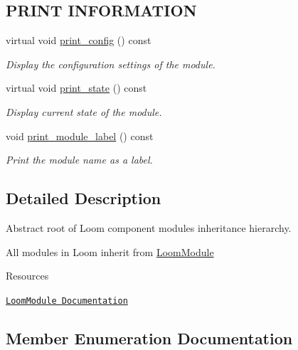 \subsection*{P\+R\+I\+NT I\+N\+F\+O\+R\+M\+A\+T\+I\+ON}
\begin{DoxyCompactItemize}
\item 
virtual void \hyperlink{class_loom_module_a4385842da9226014283136b3e37dde88}{print\+\_\+config} () const 
\begin{DoxyCompactList}\small\item\em Display the configuration settings of the module. \end{DoxyCompactList}\item 
virtual void \hyperlink{class_loom_module_a96505b45f2e712eab5de873b4d49dfc7}{print\+\_\+state} () const 
\begin{DoxyCompactList}\small\item\em Display current state of the module. \end{DoxyCompactList}\item 
void \hyperlink{class_loom_module_a636735282f2208ab71403ae5720622ba}{print\+\_\+module\+\_\+label} () const 
\begin{DoxyCompactList}\small\item\em Print the module name as a label. \end{DoxyCompactList}\end{DoxyCompactItemize}


\subsection{Detailed Description}
Abstract root of Loom component modules inheritance hierarchy. 

All modules in Loom inherit from \hyperlink{class_loom_module}{Loom\+Module}

\begin{DoxyParagraph}{Resources}

\begin{DoxyItemize}
\item \href{https://openslab-osu.github.io/Loom/html/class_loom_module.html}{\tt Loom\+Module Documentation} 
\end{DoxyItemize}
\end{DoxyParagraph}


\subsection{Member Enumeration Documentation}
